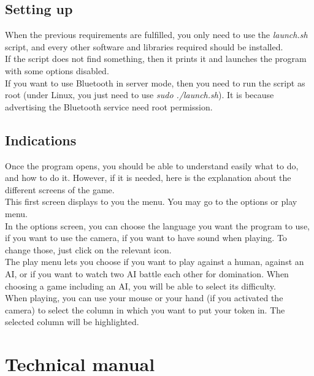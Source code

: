 \documentclass[11pt, a4paper, oneside]{report}
\begin{document}
	\section{Setting up}
	When the previous requirements are fulfilled, you only need to use the \textit{launch.sh} script, and every other software and libraries required should be installed. \\
	If the script does not find something, then it prints it and launches the program with some options disabled. \\
	If you want to use Bluetooth in server mode, then you need to run the script as root (under Linux, you just need to use \textit{sudo ./launch.sh}). It is because advertising the Bluetooth service need root permission.

	\section{Indications}
	Once the program opens, you should be able to understand easily what to do, and how to do it. However, if it is needed, here is the explanation about the different screens of the game. \\

	This first screen displays to you the menu. You may go to the options or play menu. \\
	\hspace*{1cm} In the options screen, you can choose the language you want the program to use, if you want to use the camera, if you want to have sound when playing. To change those, just click on the relevant icon. \\
	\hspace*{1cm} The play menu lets you choose if you want to play against a human, against an AI, or if you want to watch two AI battle each other for domination. When choosing a game including an AI, you will be able to select its difficulty. \\

	When playing, you can use your mouse or your hand (if you activated the camera) to select the column in which you want to put your token in. The selected column will be highlighted.

	\chapter{Technical manual}
\end{document}
